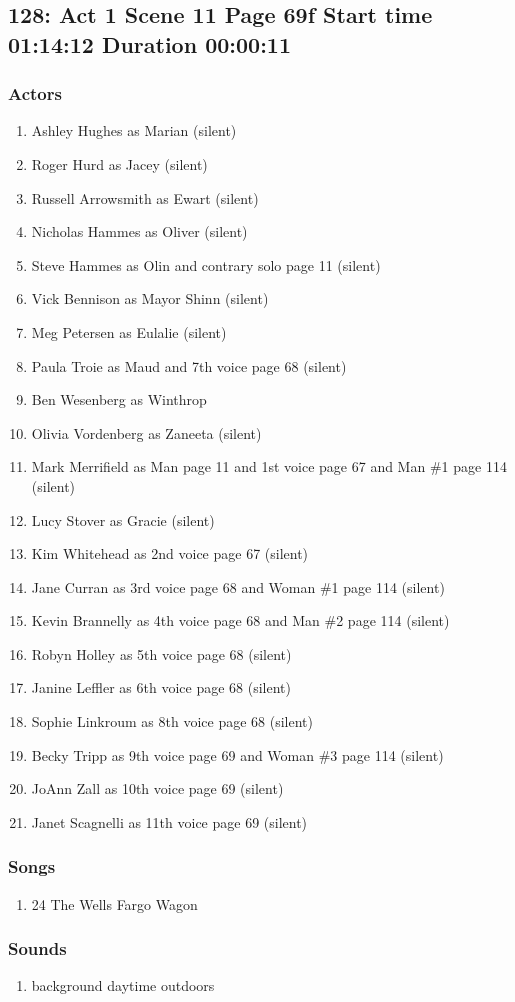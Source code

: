 \subsection{128: Act 1 Scene 11 Page 69f Start time 01:14:12 Duration 00:00:11}

\subsubsection{Actors}
\begin{enumerate}
\item Ashley Hughes as Marian (silent)
\item Roger Hurd as Jacey (silent)
\item Russell Arrowsmith as Ewart (silent)
\item Nicholas Hammes as Oliver (silent)
\item Steve Hammes as Olin and contrary solo page 11 (silent)
\item Vick Bennison as Mayor Shinn (silent)
\item Meg Petersen as Eulalie (silent)
\item Paula Troie as Maud and 7th voice page 68 (silent)
\item Ben Wesenberg as Winthrop
\item Olivia Vordenberg as Zaneeta (silent)
\item Mark Merrifield as Man page 11 and 1st voice page 67 and Man \#1 page 114 (silent)
\item Lucy Stover as Gracie (silent)
\item Kim Whitehead as 2nd voice page 67 (silent)
\item Jane Curran as 3rd voice page 68 and Woman \#1 page 114 (silent)
\item Kevin Brannelly as 4th voice page 68 and Man \#2 page 114 (silent)
\item Robyn Holley as 5th voice page 68 (silent)
\item Janine Leffler as 6th voice page 68 (silent)
\item Sophie Linkroum as 8th voice page 68 (silent)
\item Becky Tripp as 9th voice page 69 and Woman \#3 page 114 (silent)
\item JoAnn Zall as 10th voice page 69 (silent)
\item Janet Scagnelli as 11th voice page 69 (silent)
\end{enumerate}

\subsubsection{Songs}
\begin{enumerate}
\item 24 The Wells Fargo Wagon
\end{enumerate}\subsubsection{Sounds}
\begin{enumerate}
\item background daytime outdoors
\end{enumerate}
